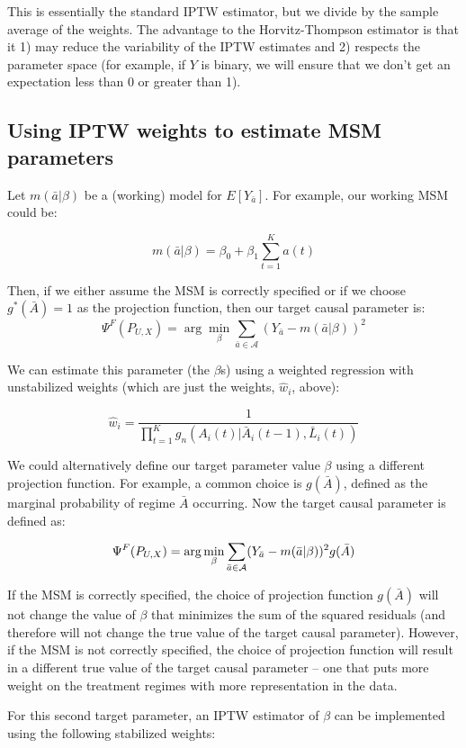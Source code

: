 \documentclass{exam}
\begin{document}
\noindent This is essentially the standard IPTW estimator, but we divide by the sample average of the weights. The advantage to the Horvitz-Thompson estimator is that it 1) may reduce the variability of the IPTW estimates and 2) respects the parameter space (for example, if $Y$ is binary, we will ensure that we don't get an expectation less than 0 or greater than 1).

\subsection{Using IPTW weights to estimate MSM parameters}

Let $m(\bar{a}|\beta)$ be a (working) model for $E[Y_{\bar{a}}]$. For example, our working MSM could be:

\[
m(\bar{a}|\beta) =\beta_0+\beta_1\sum_{t=1}^Ka(t)
\] 

\noindent Then, if we either assume the MSM is correctly specified or if we choose $g^*(\bar{A})=1$ as the projection function, then our target causal parameter is:
\[
\Psi^F(P_{U,X})=\arg\min_\beta \sum_{\bar{a} \in \mathcal{A}}(Y_{\bar{a}}-m(\bar{a}|\beta))^2
\]

\noindent We can estimate this parameter (the $\beta$s) using a weighted regression with unstabilized weights (which are just the weights, $\hat{w}_i$, above):

\[
\hat{w}_i = \frac{1}{\prod_{t=1}^Kg_n(A_i(t)|\bar{A}_i(t-1), \bar{L}_i(t))}
\]

\noindent We could alternatively define our target parameter value $\beta$ using a different projection function. For example, a common choice is $g(\bar{A})$, defined as the marginal probability of regime $\bar{A}$ occurring. Now the target causal parameter is defined as:

\[
\Psi^F(P_{U,X})=\arg\min_\beta \sum_{\bar{a} \in {\cal A}}(Y_{\bar{a}}-m(\bar{a}|\beta))^2 g(\bar{A})
\]

\noindent If the MSM is correctly specified, the choice of projection function $g(\bar{A})$ will not change the value of $\beta$ that minimizes the sum of the squared residuals (and therefore will not change the true value of the target causal parameter). However, if the MSM is not correctly specified, the choice of projection function will result in a different true value of the target causal parameter -- one that puts more weight on the treatment regimes with more representation in the data.

\noindent For this second target parameter, an IPTW estimator of $\beta$ can be implemented using the following stabilized weights:
\end{document}
